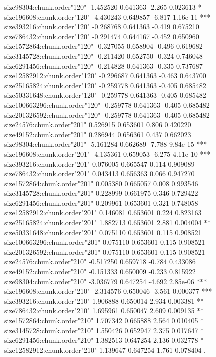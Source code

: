 \documentclass[11pt]{article}
\begin{document}
\begin{Schunk}
\begin{Soutput}
size98304:chunk.order"120"     -1.452520   0.641363  -2.265 0.023613 *  
size196608:chunk.order"120"    -4.430243   0.649857  -6.817 1.16e-11 ***
size393216:chunk.order"120"    -0.268768   0.641363  -0.419 0.675210    
size786432:chunk.order"120"    -0.291474   0.644167  -0.452 0.650960    
size1572864:chunk.order"120"   -0.327055   0.658904  -0.496 0.619682    
size3145728:chunk.order"120"   -0.211420   0.652750  -0.324 0.746048    
size6291456:chunk.order"120"   -0.214828   0.641363  -0.335 0.737687    
size12582912:chunk.order"120"  -0.296687   0.641363  -0.463 0.643700    
size25165824:chunk.order"120"  -0.259778   0.641363  -0.405 0.685482    
size50331648:chunk.order"120"  -0.259778   0.641363  -0.405 0.685482    
size100663296:chunk.order"120" -0.259778   0.641363  -0.405 0.685482    
size201326592:chunk.order"120" -0.259778   0.641363  -0.405 0.685482    
size24576:chunk.order"201"      0.526915   0.653601   0.806 0.420220    
size49152:chunk.order"201"      0.286944   0.656361   0.437 0.662023    
size98304:chunk.order"201"     -5.161284   0.662689  -7.788 9.84e-15 ***
size196608:chunk.order"201"    -4.135361   0.659053  -6.275 4.11e-10 ***
size393216:chunk.order"201"     0.076005   0.665547   0.114 0.909089    
size786432:chunk.order"201"     0.043413   0.656363   0.066 0.947270    
size1572864:chunk.order"201"    0.005380   0.665057   0.008 0.993546    
size3145728:chunk.order"201"    0.228999   0.661975   0.346 0.729422    
size6291456:chunk.order"201"    0.209961   0.653601   0.321 0.748058    
size12582912:chunk.order"201"   0.146081   0.653601   0.224 0.823163    
size25165824:chunk.order"201"   1.882713   0.653601   2.881 0.004004 ** 
size50331648:chunk.order"201"   0.075110   0.653601   0.115 0.908521    
size100663296:chunk.order"201"  0.075110   0.653601   0.115 0.908521    
size201326592:chunk.order"201"  0.075110   0.653601   0.115 0.908521    
size24576:chunk.order"210"     -0.517250   0.659718  -0.784 0.433086    
size49152:chunk.order"210"     -0.151333   0.650009  -0.233 0.815922    
size98304:chunk.order"210"     -3.036779   0.647254  -4.692 2.85e-06 ***
size196608:chunk.order"210"    -2.314576   0.650046  -3.561 0.000377 ***
size393216:chunk.order"210"     1.906888   0.650014   2.934 0.003381 ** 
size786432:chunk.order"210"     1.695961   0.650047   2.609 0.009135 ** 
size1572864:chunk.order"210"    1.707342   0.665888   2.564 0.010405 *  
size3145728:chunk.order"210"    1.550426   0.652947   2.375 0.017647 *  
size6291456:chunk.order"210"    1.382513   0.647254   2.136 0.032778 *  
size12582912:chunk.order"210"   1.139647   0.647254   1.761 0.078404 .  

\end{Soutput}
\end{Schunk}
\end{document}
